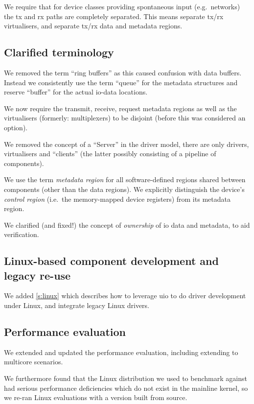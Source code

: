 \documentclass[a4paper,12pt]{report}
\begin{document}
We require that for device classes providing spontaneous input (e.g.\
networks) the \gls{tx} and \gls{rx} paths are completely separated. This means
separate \gls{tx}/\gls{rx} virtualisers, and separate \gls{tx}/\gls{rx} data and metadata regions.

\subsection{Clarified terminology}

We removed the term ``ring buffers'' as this caused confusion with
data buffers. Instead we consistently use the term ``queue'' for the
metadata structures and reserve ``buffer'' for the actual \gls{io}-data
locations.

We now require the transmit, receive, request metadata regions as well
as the virtualisers (formerly: multiplexers) to be disjoint (before
this was considered an option).

We removed the concept of a ``Server'' in the driver model, there are
only drivers, virtualisers and ``clients'' (the latter possibly
consisting of a pipeline of components).

We use the term \emph{metadata region} for all software-defined
regions shared between components (other than the data regions). We
explicitly distinguish the device's \emph{control region} (i.e.\ the
memory-mapped device registers) from its metadata region.

We clarified (and fixed!) the concept of \emph{ownership} of \gls{io} data
and metadata, to aid verification.

\subsection{Linux-based component development and legacy re-use}

We added \autoref{s:linux} which describes how to leverage \gls{uio} to do
driver development under Linux, and integrate legacy Linux drivers.

\subsection{Performance evaluation}

We extended and updated the performance evaluation, including
extending to multicore scenarios.

We furthermore found that the Linux distribution we used to benchmark
against had serious performance deficiencies which do not exist in the
mainline kernel, so we re-ran Linux evaluations with a version built
from source.
\end{document}
